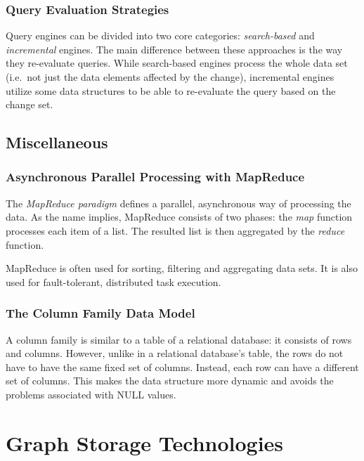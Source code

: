 \subsubsection{Query Evaluation Strategies}

Query engines can be divided into two core categories: \emph{search-based} and \emph{incremental} engines. The main difference between these approaches is the way they re-evaluate queries. While search-based engines process the whole data set (i.e.\ not just the data elements affected by the change), incremental engines utilize some data structures to be able to re-evaluate the query based on the change set.

\subsection{Miscellaneous}
\label{concepts-misc}

\subsubsection{Asynchronous Parallel Processing with MapReduce}

The \emph{MapReduce paradigm} defines a parallel, asynchronous way of processing the data. As the name implies, MapReduce consists of two phases: the \emph{map} function processes each item of a list. The resulted list is then aggregated by the \emph{reduce} function.

MapReduce is often used for sorting, filtering and aggregating data sets. It is also used for fault-tolerant, distributed task execution.

\subsubsection{The Column Family Data Model}

A column family is similar to a table of a relational database: it consists of rows and columns. However, unlike in a relational database's table, the rows do not have to have the same fixed set of columns. Instead, each row can have a different set of columns. This makes the data structure more dynamic and avoids the problems associated with NULL values.


\section{Graph Storage Technologies}
\label{graph-storage-technologies}

